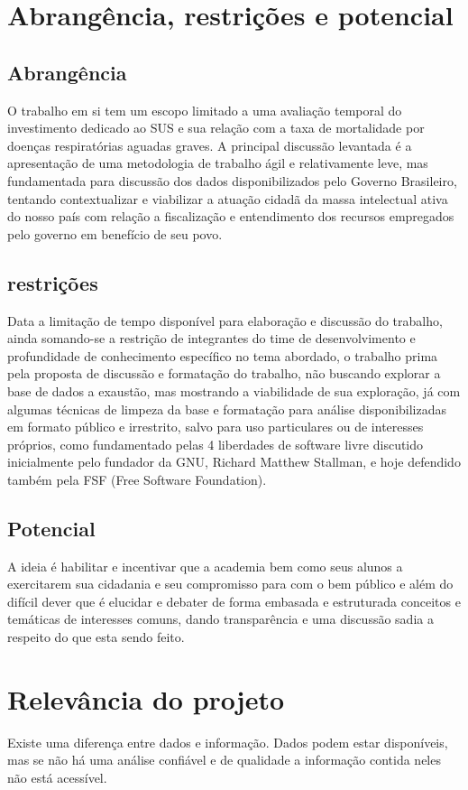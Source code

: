 \documentclass[journal]{IEEEtran}
\begin{document}
\section{Abrangência, restrições e potencial}
\subsection{Abrangência}
O trabalho em si tem um escopo limitado a uma avaliação temporal do investimento dedicado ao SUS e sua relação com a taxa de mortalidade por doenças respiratórias aguadas graves. 
A principal discussão levantada é a apresentação de uma metodologia de trabalho ágil e relativamente leve, mas  fundamentada para discussão dos dados disponibilizados pelo Governo Brasileiro, tentando contextualizar e viabilizar a atuação cidadã da massa intelectual ativa do nosso país com relação a fiscalização e entendimento dos recursos empregados pelo governo em benefício de seu povo.

\subsection{restrições}
Data a limitação de tempo disponível para elaboração e discussão do trabalho, ainda somando-se a restrição de integrantes do time de desenvolvimento e profundidade de conhecimento específico no tema abordado, o trabalho prima pela proposta de discussão e formatação do trabalho, não buscando explorar a base de dados a exaustão, mas mostrando a viabilidade de sua exploração, já com algumas técnicas de limpeza da base e formatação para análise disponibilizadas em formato público e irrestrito, salvo para uso particulares ou de interesses próprios, como fundamentado pelas 4 liberdades de software livre \cite{gnu} discutido inicialmente pelo fundador da GNU, Richard Matthew Stallman, e hoje defendido também pela FSF (Free Software Foundation).

\subsection{Potencial}
A ideia é habilitar e incentivar que a academia bem como seus alunos a exercitarem sua cidadania e seu compromisso para com o bem público e além do difícil dever que é elucidar e debater de forma embasada e estruturada conceitos e temáticas de interesses comuns, dando transparência e uma discussão sadia a respeito do que esta sendo feito.

\section{Relevância do projeto}
Existe uma diferença entre dados e informação. Dados podem estar disponíveis, mas se não há uma análise confiável e de qualidade a informação contida neles não está acessível.
\end{document}
